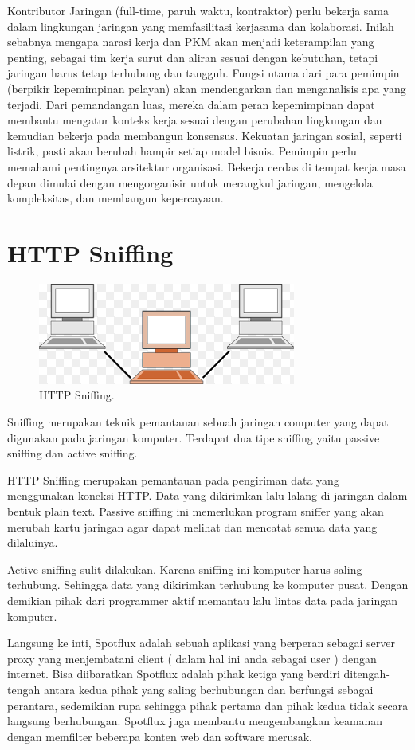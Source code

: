 \documentclass{jtetiproposalskripsi}
\begin{document}
Kontributor Jaringan (full-time, paruh waktu, kontraktor) perlu bekerja sama dalam lingkungan jaringan yang memfasilitasi kerjasama dan kolaborasi. Inilah sebabnya mengapa narasi kerja dan PKM akan menjadi keterampilan yang penting, sebagai tim kerja surut dan aliran sesuai dengan kebutuhan, tetapi jaringan harus tetap terhubung dan tangguh. Fungsi utama dari para pemimpin (berpikir kepemimpinan pelayan) akan mendengarkan dan menganalisis apa yang terjadi. Dari pemandangan luas, mereka dalam peran kepemimpinan dapat membantu mengatur konteks kerja sesuai dengan perubahan lingkungan dan kemudian bekerja pada membangun konsensus. Kekuatan jaringan sosial, seperti listrik, pasti akan berubah hampir setiap model bisnis. Pemimpin perlu memahami pentingnya arsitektur organisasi. Bekerja cerdas di tempat kerja masa depan dimulai dengan mengorganisir untuk merangkul jaringan, mengelola kompleksitas, dan membangun kepercayaan.

\section{HTTP Sniffing}
\begin{figure}[ht!]
  \centering
    \includegraphics{gambar/3}
    \caption{HTTP Sniffing.}
    \label{wsn}
\end{figure}
Sniffing merupakan teknik pemantauan sebuah jaringan computer yang dapat digunakan pada jaringan komputer. Terdapat dua tipe sniffing yaitu passive sniffing dan active sniffing.

HTTP Sniffing merupakan pemantauan pada pengiriman data yang menggunakan koneksi HTTP. Data yang dikirimkan lalu lalang di jaringan dalam bentuk plain text.
Passive sniffing ini memerlukan program sniffer yang akan merubah kartu jaringan agar dapat melihat dan mencatat semua data yang dilaluinya.

Active sniffing sulit dilakukan. Karena sniffing ini komputer harus saling terhubung.  Sehingga data yang dikirimkan terhubung ke komputer pusat. Dengan demikian pihak dari programmer aktif memantau lalu lintas data pada jaringan komputer.
 
Langsung ke inti, Spotflux adalah sebuah aplikasi yang berperan sebagai server proxy yang menjembatani client ( dalam hal ini anda sebagai user ) dengan internet. Bisa diibaratkan Spotflux adalah pihak ketiga yang berdiri ditengah-tengah antara kedua pihak yang saling berhubungan dan berfungsi sebagai perantara, sedemikian rupa sehingga pihak pertama dan pihak kedua tidak secara langsung berhubungan. Spotflux juga membantu mengembangkan keamanan dengan memfilter beberapa konten web dan software merusak.
\end{document}
